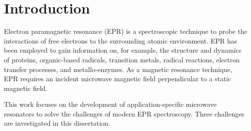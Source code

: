 \chapter[Introduction]{Introduction}

    
Electron paramagnetic resonance (EPR) is a spectroscopic technique to probe the interactions of free electrons to the surrounding atomic environment. EPR has been employed to gain information on, for example, the structure and dynamics of proteins, organic-based radicals, transition metals, radical reactions, electron transfer processes, and metallo-enzymes. As a magnetic resonance technique, EPR requires an incident microwave magnetic field perpendicular to a static magnetic field.\cite{weil2007electron} 

This work focuses on the development of application-specific microwave resonators to solve the challenges of modern EPR spectroscopy. Three challenges are investigated in this dissertation. 

